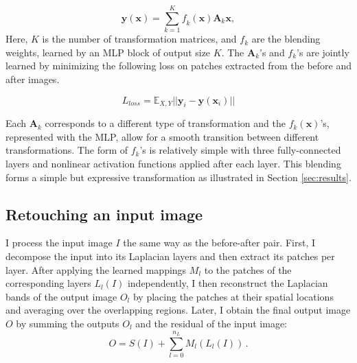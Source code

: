 \begin{equation} 
	\mathbf{y} (\mathbf{x}) = \sum_{k=1}^K
	\mathit{f}_k (\mathbf{x}) \mathbf{A}_k \mathbf{x},
	\label{eq:weightedSum}
\end{equation} 
Here, $K$ is the number of transformation matrices, and $f_k$ are the blending weights, learned by an MLP block of output size $K$. The $\mathbf{A}_k$'s and $f_k$'s are jointly learned by minimizing the following loss on patches extracted from the before and after images.

\begin{equation}
    L_{loss}  = \mathbb{E}_{X, Y} || \mathbf{y}_i -   \mathbf{y} (\mathbf{x}_i) ||
\end{equation}

Each $\mathbf{A}_k$ corresponds to a different type of transformation and the $f_k(\mathbf{x})$'s, represented with the MLP, allow for a smooth transition between different transformations. The form of $f_k$'s is relatively simple with three fully-connected layers and nonlinear activation functions applied after each layer. This blending forms a simple but expressive transformation as illustrated in Section \ref{sec:results}.

\subsection{Retouching an input image}

I process the input image $I$ the same way as the before-after pair. First, I decompose the input into its Laplacian layers and then extract its patches per layer. After applying the learned mappings $M_l$ to the patches of the corresponding layers $L_{l}(I)$ independently, I then reconstruct the Laplacian bands of the output image $O_l$ by placing the patches at their spatial locations and averaging over the overlapping regions. Later, I obtain the final output image $O$ by summing the outputs $O_l$ and the residual of the input image:
\begin{equation}
    O = S(I) + \sum_{l=0}^{n_L} M_l(L_l(I))\,.
\end{equation}

